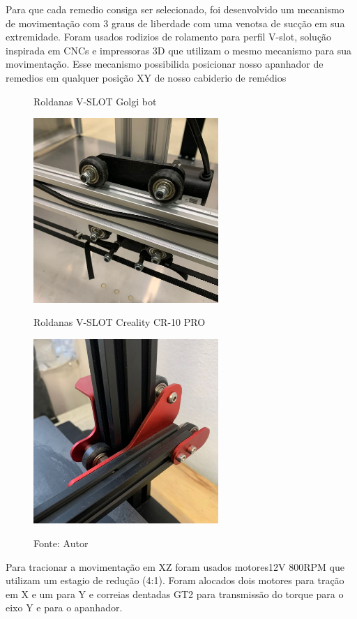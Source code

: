 \documentclass[../poliXuniversity_hospital_(USP)_report.tex]{subfiles}
\begin{document}
Para que cada remedio consiga ser selecionado, foi desenvolvido um mecanismo de movimentação com 3 graus de liberdade com uma venotsa de sucção em sua extremidade. Foram usados rodizios de rolamento para perfil V-slot, solução inspirada em CNCs e impressoras 3D que utilizam o mesmo mecanismo para sua movimentação. Esse mecanismo possibilida posicionar nosso apanhador de remedios em qualquer posição XY de nosso cabiderio de remédios


\begin{figure}[h]
\centering
    \begin{minipage}{0.5\textwidth}
       \centering
        \caption{Roldanas V-SLOT Golgi bot}
        \centering %
        \includegraphics[width=7cm]{images/roldada_golgi.jpeg}
        \label{figura: Roldanas V-SLOT Golgi bot}
    \end{minipage}\hfill
    \begin{minipage}{0.5\textwidth}
        \centering
        \caption{Roldanas V-SLOT Creality CR-10 PRO}
        \centering %
        \includegraphics[width=7cm]{images/roldanacr10.jpeg}
        \label{figura: Roldanas V-SLOT Creality CR-10 PRO}
    \end{minipage}\hfill
    \caption*{Fonte: Autor}
\end{figure}
Para tracionar a movimentação em XZ foram usados motores12V 800RPM que utilizam um estagio de redução (4:1). Foram alocados dois motores para tração em X e um para Y e correias dentadas GT2 para transmissão do torque para o eixo Y e para o apanhador.
\end{document}
